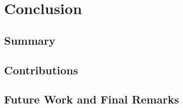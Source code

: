 \chapter{Conclusion}

\section{Summary}
\section{Contributions}
\section{Future Work and Final Remarks}


